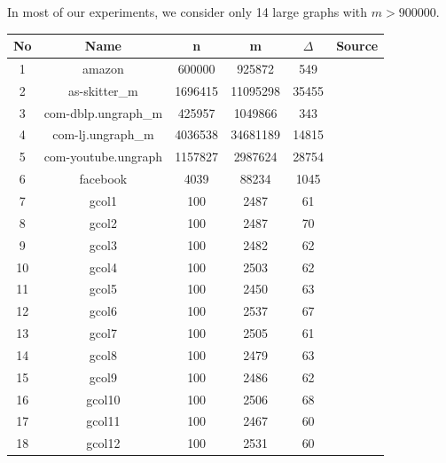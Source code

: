 \documentclass[MTech]{iitmdiss}
\begin{document}
In most of our experiments, we consider only 14 large graphs with $m > 900000$.
\begin{table}[h]
\centering
\begin{tabular}{||c|c|c|c|c|c||} 
 \hline
 No & Name & n & m & $\Delta$ & Source \\ [0.5ex] 
 \hline\hline
1  & amazon                  & 600000  & 925872   & 549    & \cite{snapnets}    \\
\hline
2  & as-skitter\_m            & 1696415 & 11095298 & 35455  & \cite{snapnets}    \\
\hline
3  & com-dblp.ungraph\_m      & 425957  & 1049866  & 343    & \cite{snapnets}    \\
\hline
4  & com-lj.ungraph\_m        & 4036538 & 34681189 & 14815  & \cite{snapnets}    \\
\hline
5  & com-youtube.ungraph     & 1157827 & 2987624  & 28754  & \cite{snapnets}    \\
\hline
6  & facebook                & 4039    & 88234    & 1045   & \cite{snapnets}    \\
\hline
7  & gcol1                   & 100     & 2487     & 61     & \cite{Beasley1990} \\
\hline
8  & gcol2                   & 100     & 2487     & 70     & \cite{Beasley1990} \\
\hline
9  & gcol3                   & 100     & 2482     & 62     & \cite{Beasley1990} \\
\hline
10 & gcol4                   & 100     & 2503     & 62     & \cite{Beasley1990} \\
\hline
11 & gcol5                   & 100     & 2450     & 63     & \cite{Beasley1990} \\
\hline
12 & gcol6                   & 100     & 2537     & 67     & \cite{Beasley1990} \\
\hline
13 & gcol7                   & 100     & 2505     & 61     & \cite{Beasley1990} \\
\hline
14 & gcol8                   & 100     & 2479     & 63     & \cite{Beasley1990} \\
\hline
15 & gcol9                   & 100     & 2486     & 62     & \cite{Beasley1990} \\
\hline
16 & gcol10                  & 100     & 2506     & 68     & \cite{Beasley1990} \\
\hline
17 & gcol11                  & 100     & 2467     & 60     & \cite{Beasley1990} \\
\hline
18 & gcol12                  & 100     & 2531     & 60     & \cite{Beasley1990} \\

\end{tabular}
\end{table}
\end{document}
